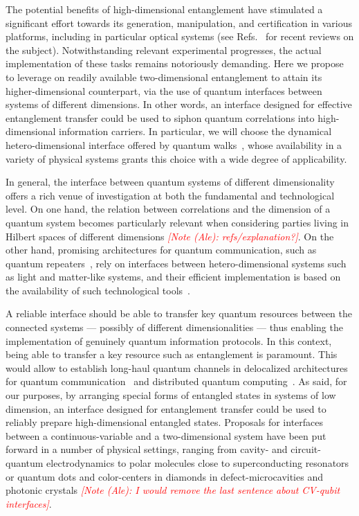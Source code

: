 \documentclass[
	aps, pra,
	superscriptaddress, twocolumn,
	floatfix,
	10pt
]{revtex4-1}
\newcommand{\parTitle}[1]{\noindent{\color{Mahogany}(\emph{#1})}}
\newcommand{\commale}[1]{{\textcolor{red} {\it{[Note (Ale): #1]}}}}
\renewcommand{\parTitle}[1]{}
\begin{document}
\parTitle{HD entanglement is challenging, here is what we propose to do in a nutshell} The potential benefits of high-dimensional entanglement have stimulated a significant effort towards its generation, manipulation, and certification in various platforms, including in particular optical systems (see Refs.~\cite{friis2019entanglement, erhard2020advances} for recent reviews on the subject). Notwithstanding relevant experimental progresses, the actual implementation of these tasks remains notoriously demanding. Here we propose to leverage on readily available two-dimensional entanglement to attain its higher-dimensional counterpart, via the use of quantum interfaces between systems of different dimensions. In other words, an interface designed for effective entanglement transfer could be used to siphon quantum correlations into high-dimensional information carriers. In particular, we will choose the dynamical hetero-dimensional interface offered by quantum walks~\cite{aharonov1993quantum,nayak2000quantum,ambainis2001onedimensional,Kempe2003quantum,venegas-andraca2012quantum}, whose availability in a variety of physical systems grants this choice with a wide degree of applicability.

\parTitle{Interfacing systems are of general interest}
In general, the interface between quantum systems of different dimensionality offers a rich venue of investigation at both the fundamental and technological level. On one hand, the relation between correlations and the dimension of a quantum system becomes particularly relevant when considering parties living in Hilbert spaces of different dimensions \commale{refs/explanation?}. 
On the other hand, promising architectures for quantum communication, such as quantum repeaters~\cite{Lvovsky2009}, rely on interfaces between hetero-dimensional systems such as light and matter-like systems, and their efficient implementation is based on the availability of such technological tools~\cite{Kimble2008,Hammerer2010,Brask2010}.

\parTitle{What is a good interface and why it is useful for us}
A reliable interface should be able to transfer key quantum resources between the connected systems --- possibly of different dimensionalities --- thus enabling the implementation of genuinely quantum information protocols. In this context, being able to transfer a key resource such as entanglement is paramount.
This would allow to establish long-haul quantum channels in delocalized architectures for quantum communication~\cite{Kimble2008} and distributed quantum computing~\cite{Collins2001,Eisert2000,Huelga2001,Huelga2002,Paternostro2003}. As said, for our purposes, by arranging special forms of entangled states in systems of low dimension, an interface designed for entanglement transfer could be used to reliably prepare high-dimensional entangled states.
Proposals for interfaces between a continuous-variable and a two-dimensional system have been put forward in a number of physical settings, ranging from cavity- and circuit-quantum electrodynamics to polar molecules close to superconducting resonators or quantum dots and color-centers in diamonds in defect-microcavities and photonic crystals \commale{I would remove the last sentence about CV-qubit interfaces}. 
\end{document}
